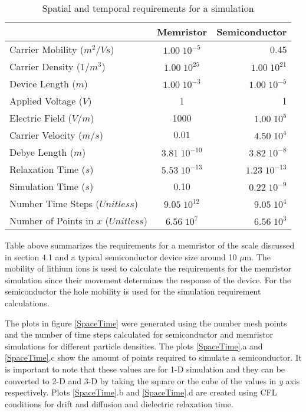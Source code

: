 \begin{doublespace}
\begin{table}
\begin{center}
  \begin{tabular}{ l | c | r }
    \hline
      & Memristor & Semiconductor \\ \hline
    Carrier Mobility ($m^2/Vs$)& $1.00\;10^{-5}$ & 0.45 \\ \hline
     Carrier Density ($1/m^3$)& $1.00\;10^{25}$ & $1.00\;10^{21}$ \\ \hline
    Device Length ($m$) & $1.00\;10^{-3}$ & $1.00\;10^{-5}$ \\ \hline
    Applied Voltage ($V$) & 1 & 1 \\ \hline
     Electric Field ($V/m$) & 1000 & $1.00\;10^{5}$ \\ \hline
    Carrier Velocity ($m/s$) & $0.01$ & $4.50\;10^{4}$ \\ \hline
      Debye Length ($m$) & $3.81\;10^{-10}$ & $3.82\;10^{-8}$ \\  \hline
    Relaxation Time ($s$) & $5.53\;10^{-13}$ & $1.23\;10^{-13}$ \\  \hline
    Simulation Time ($s$) & 0.10 & $0.22\;10^{-9}$ \\  \hline
    Number Time Steps ($Unitless$) & $9.05\; 10^{12}$ & $9.05\; 10^4$ \\  \hline
     Number of Points in $x$ ($Unitless$) & $6.56\; 10^7$  &  $6.56\; 10^3$   
  \end{tabular}
      \caption{Spatial and temporal requirements for a simulation} 
\end{center}
\end{table}
Table above summarizes the requirements for a memristor of the scale discussed in section 4.1 and a typical semiconductor device size around 10 $\mu$m. The mobility of lithium ions is used to calculate the requirements for the memristor simulation since their movement determines the response of the device. For the semiconductor the hole mobility is used for the simulation requirement calculations.

The plots in figure \ref{SpaceTime} were generated using the number mesh points and the number of time steps calculated for semiconductor and memristor simulations for different particle densities. The plots \ref{SpaceTime}.a and \ref{SpaceTime}.c show the amount of points required to simulate a semiconductor. It is important to note that these values are for 1-D simulation and they can be converted to 2-D and 3-D by taking the square or the cube of the values in \textit{y} axis respectively. Plots \ref{SpaceTime}.b and \ref{SpaceTime}.d are created using CFL conditions for drift and diffusion and dielectric relaxation time.


\end{doublespace}
